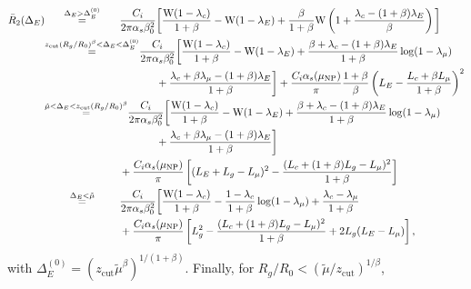 \documentclass[letterpaper,11pt]{article}
\newcommand{\mut}{\tilde\mu}
\newcommand{\xlog}{{\rm W}}
\newcommand{\wideeq}[1]{\makebox[{#1}]{$=$}}
\newcommand{\as}{\alpha_s}
\newcommand{\zcut}{z_\text{cut}}
\begin{document}
\begin{align}
\bar{R}_2(\Delta_E)
 & \overset{\Delta_E > \Delta_E^{(0)}}{\wideeq{2.5cm}} \frac{C_i}{2\pi \alpha_s \beta_0^2} \bigg[
     \frac{\xlog(1-\lambda_c)}{1+\beta}
     -\xlog(1-\lambda_E)
     +\frac{\beta}{1+\beta} \xlog\left(1+\frac{\lambda_c-(1+\beta) \lambda_E}{\beta}\right) \bigg]\\
 & \overset{\zcut (R_g/R_0)^\beta < \Delta_E < \Delta_E^{(0)}}{\wideeq{2.5cm}}  \frac{C_i}{2\pi \alpha_s \beta_0^2} \bigg[
     \frac{\xlog(1-\lambda_c)}{1+\beta}
     -\xlog(1-\lambda_E)
     +\frac{\beta+\lambda_c-(1+\beta) \lambda_E}{1+\beta} \log(1-\lambda_\mu)\notag\\
     & \phantom{\wideeq{2.5cm} \frac{C_i}{2\pi \alpha_s \beta_0^2}}
     +\frac{\lambda_c+\beta \lambda_\mu-(1+\beta) \lambda_E}{1+\beta} \bigg] + \frac{C_i\as(\mu_\text{NP})}{\pi} \frac{1+\beta}{\beta} \left(L_E-\frac{L_c+\beta L_\mu}{1+\beta}\right)^2 \\
 & \overset{\mut< \Delta_E < \zcut (R_g/R_0)^\beta}{\wideeq{2.5cm}}  \frac{C_i}{2\pi \alpha_s \beta_0^2} \bigg[
     \frac{\xlog(1-\lambda_c)}{1+\beta}
     -\xlog(1-\lambda_E)
     +\frac{\beta+\lambda_c-(1+\beta)\lambda_E}{1+\beta} \log(1-\lambda_\mu)\notag\\
     & \phantom{\wideeq{2.5cm} \frac{C_i}{2\pi \alpha_s \beta_0^2}}
     +\frac{\lambda_c+\beta \lambda_\mu-(1+\beta) \lambda_E}{1+\beta} \bigg] \notag\\
     & \phantom{\wideeq{2.5cm}} + \frac{C_i\as(\mu_\text{NP})}{\pi} \left[(L_E+L_g-L_\mu)^2 - \frac{(L_c+(1+\beta) L_g-L_\mu)^2}{1+\beta}\right]\\
 & \overset{\Delta_E < \mut}{\wideeq{2.5cm}}  \frac{C_i}{2\pi \alpha_s \beta_0^2} \bigg[
     \frac{\xlog(1-\lambda_c)}{1+\beta}
     -\frac{1-\lambda_c}{1+\beta} \log(1-\lambda_\mu)
     +\frac{\lambda_c-\lambda_\mu}{1+\beta} \notag\\
     & \phantom{\wideeq{2.5cm}} + \frac{C_i\as(\mu_\text{NP})}{\pi} \left[L_g^2-\frac{(L_c+(1+\beta) L_g-L_\mu)^2}{1+\beta}+2 L_g(L_E-L_\mu) \right],
\end{align}
with $\Delta_E^{(0)}=(\zcut\mut^\beta)^{1/(1+\beta)}$. Finally, for $R_g/R_0< (\mut/\zcut)^{1/\beta}$, 
\end{document}
